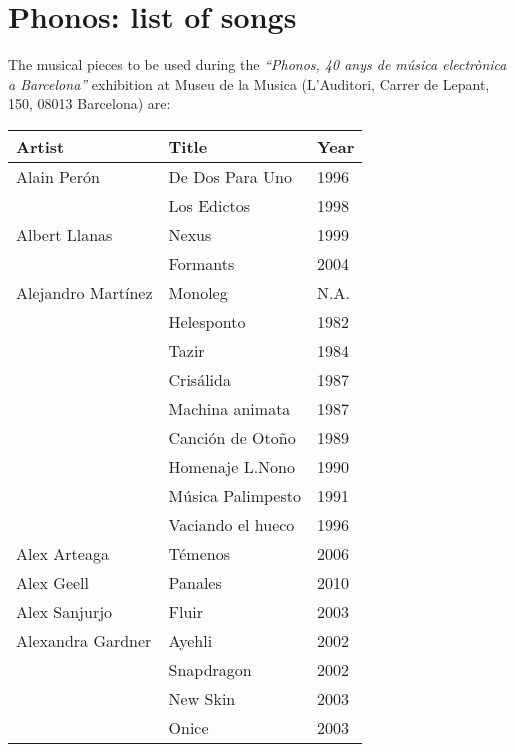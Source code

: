 \chapter{Phonos: list of songs} 

\label{AppendixC} 


The musical pieces to be used during the \textit{``Phonos, 40 anys de música electrònica a Barcelona''} exhibition at Museu de la Musica (L'Auditori, Carrer de Lepant, 150, 08013 Barcelona) are: 

\begin{center}
\begin{longtable}{ p{}  p{}  p{} } 
\textbf{Artist} & \textbf{Title} & \textbf{Year} \\ \toprule
Alain Perón & De Dos Para Uno & 1996 \\ \cmidrule(r){2-3}
& Los Edictos & 1998 \\ \midrule 
Albert Llanas & Nexus & 1999 \\ \cmidrule (r){2-3}
& Formants & 2004 \\ \midrule 
Alejandro Martínez & Monoleg & N.A. \\ \cmidrule (r){2-3}
& Helesponto & 1982 \\ \cmidrule (r){2-3}
& Tazir & 1984 \\ \cmidrule (r){2-3}
& Crisálida & 1987 \\ \cmidrule (r){2-3} 
& Machina animata & 1987 \\ \cmidrule (r){2-3} 
& Canción de Otoño & 1989 \\ \cmidrule (r){2-3} 
& Homenaje L.Nono & 1990 \\ \cmidrule (r){2-3} 
& Música Palimpesto & 1991 \\ \cmidrule (r){2-3} 
& Vaciando el hueco & 1996 \\ \midrule  
Alex Arteaga & Témenos & 2006 \\ \midrule 
Alex Geell & Panales & 2010 \\ \midrule 
Alex Sanjurjo & Fluir & 2003 \\ \midrule \midrule 
Alexandra Gardner & Ayehli & 2002 \\ \cmidrule (r){2-3}  
& Snapdragon & 2002 \\ \cmidrule (r){2-3}   
& New Skin & 2003 \\ \cmidrule (r){2-3}   
& Onice & 2003 \\ \cmidrule (r){2-3}   

\end{longtable}
\end{center}
